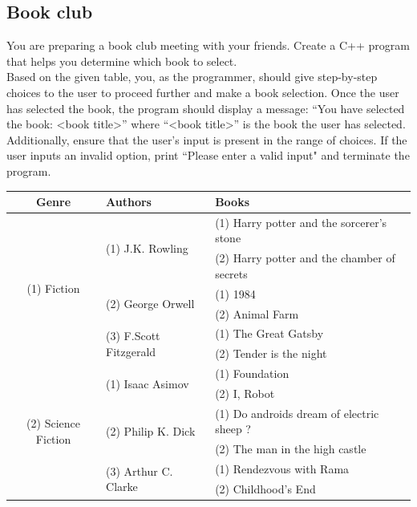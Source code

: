 \subsection{Book club}

You are preparing a book club meeting with your friends. Create a C++ program that helps you determine which book to select. \\

Based on the given table, you, as the programmer, should give step-by-step choices to the user to proceed further and make a book selection. Once the user has selected the book, the program should display a message: “You have selected the book: <book title>” where “<book title>” is the book the user has selected. \\

Additionally, ensure that the user's input is present in the range of choices. If the user inputs an invalid option, print ``Please enter a valid input" and terminate the program. 

\begin{table}[h!]
\centering
\begin{tabular}{|c|l|l|}
\hline
\textbf{Genre}        & \textbf{Authors}         & \textbf{Books}                 \\ \hline
\multirow{6}{*}{(1) Fiction } & \multirow{2}{*}{(1) J.K. Rowling} & (1) Harry potter and the sorcerer's stone            \\ \cline{3-3} 
                   &                              & (2) Harry potter and the chamber of secrets      \\ \cline{2-3} 
                   & \multirow{2}{*}{(2) 	George Orwell}     & (1) 1984          \\ \cline{3-3} 
                   &                              & (2) Animal Farm                \\ \cline{2-3} 
                   & \multirow{2}{*}{(3) F.Scott Fitzgerald} & (1) The Great Gatsby             \\ \cline{3-3} 
                   &                              & (2) Tender is the night      \\ \hline
\multirow{6}{*}{(2) Science Fiction} & \multirow{2}{*}{(1) Isaac Asimov}       & (1) Foundation \\ \cline{3-3} 
                   &                              & (2) I, Robot           \\ \cline{2-3} 
                   & \multirow{2}{*}{(2) Philip K. Dick}      & (1) Do androids dream of electric sheep ?      \\ \cline{3-3} 
                   &                              & (2) The man in the high castle              \\ \cline{2-3} 
                   & \multirow{2}{*}{(3) Arthur C. Clarke}     & (1) Rendezvous with Rama          \\ \cline{3-3} 
                   &                              & (2) Childhood's End                 \\ \hline
\end{tabular}
\end{table}


